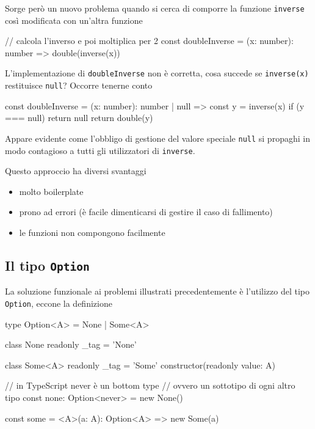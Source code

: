 \documentclass[12pt]{article}
\theoremstyle{definition}
\newenvironment{code}
  {\vspace{0.5cm} \VerbatimEnvironment\begin{typescriptcode}}
  {\end{typescriptcode} \vspace{0.2cm}}
\begin{document}
Sorge però un nuovo problema quando si cerca di comporre la funzione \texttt{inverse} così modificata con un'altra funzione

\begin{code}
// calcola l'inverso e poi moltiplica per 2
const doubleInverse = (x: number): number => double(inverse(x))
\end{code}

L'implementazione di \texttt{doubleInverse} non è corretta, cosa succede se \texttt{inverse(x)} restituisce \texttt{null}?
Occorre tenerne conto

\begin{code}
const doubleInverse = (x: number): number | null => {
  const y = inverse(x)
  if (y === null) return null
  return double(y)
}
\end{code}

Appare evidente come l'obbligo di gestione del valore speciale \texttt{null} si propaghi in modo contagioso
a tutti gli utilizzatori di \texttt{inverse}.

Questo approccio ha diversi svantaggi

\begin{itemize}
  \item molto boilerplate
  \item prono ad errori (è facile dimenticarsi di gestire il caso di fallimento)
  \item le funzioni non compongono facilmente
\end{itemize}

\subsection{Il tipo \texttt{Option}}

La soluzione funzionale ai problemi illustrati precedentemente è l'utilizzo del tipo \texttt{Option},
eccone la definizione

\begin{code}
type Option<A> = None | Some<A>

class None {
  readonly _tag = 'None'
}

class Some<A> {
  readonly _tag = 'Some'
  constructor(readonly value: A) {}
}

// in TypeScript never è un bottom type
// ovvero un sottotipo di ogni altro tipo
const none: Option<never> = new None()

const some = <A>(a: A): Option<A> => new Some(a)
\end{code}
\end{document}
